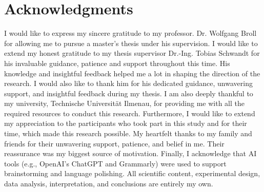 \chapter*{Acknowledgments}
I would like to express my sincere gratitude to my professor. Dr. Wolfgang Broll for allowing me to pursue a master's thesis under his supervision. I would like to extend my honest gratitude to my thesis supervisor Dr.-Ing. Tobias Schwandt for his invaluable guidance, patience and support throughout this time. His knowledge and insightful feedback helped me a lot in shaping the direction of the research. I would also like to thank him for his dedicated guidance, unwavering support, and insightful feedback during my thesis. I am also deeply thankful to my university, Technische Universität Ilmenau, for providing me with all the required resources to conduct this research. Furthermore, I would like to extend my appreciation to the participants who took part in this study and for their time, which made this research possible. My heartfelt thanks to my family and friends for their unwavering support, patience, and belief in me. Their reassurance was my biggest source of motivation. Finally, I acknowledge that AI tools (e.g., OpenAI’s ChatGPT and Grammarly) were used to support brainstorming and language polishing. All scientific content, experimental design, data analysis, interpretation, and conclusions are entirely my own.


\clearpage 